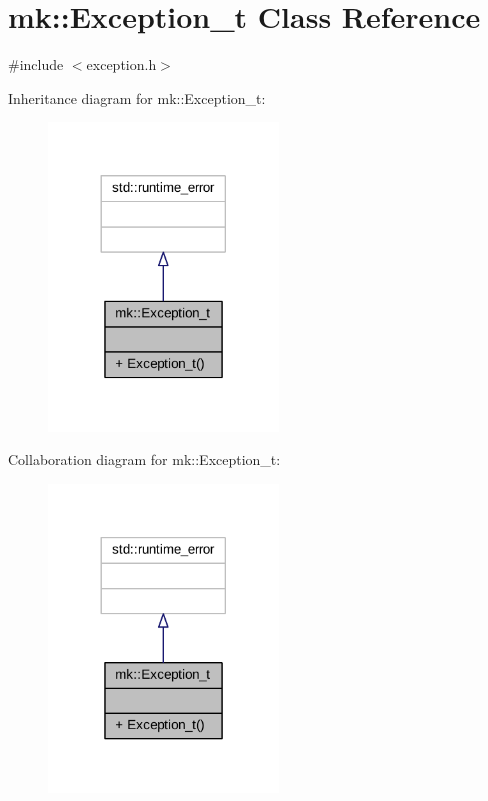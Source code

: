 \hypertarget{classmk_1_1_exception__t}{}\section{mk\+:\+:Exception\+\_\+t Class Reference}
\label{classmk_1_1_exception__t}


{\ttfamily \#include $<$exception.\+h$>$}



Inheritance diagram for mk\+:\+:Exception\+\_\+t\+:
\nopagebreak
\begin{figure}[H]
\begin{center}
\leavevmode
\includegraphics[width=173pt]{classmk_1_1_exception__t__inherit__graph}
\end{center}
\end{figure}


Collaboration diagram for mk\+:\+:Exception\+\_\+t\+:
\nopagebreak
\begin{figure}[H]
\begin{center}
\leavevmode
\includegraphics[width=173pt]{classmk_1_1_exception__t__coll__graph}
\end{center}
\end{figure}
